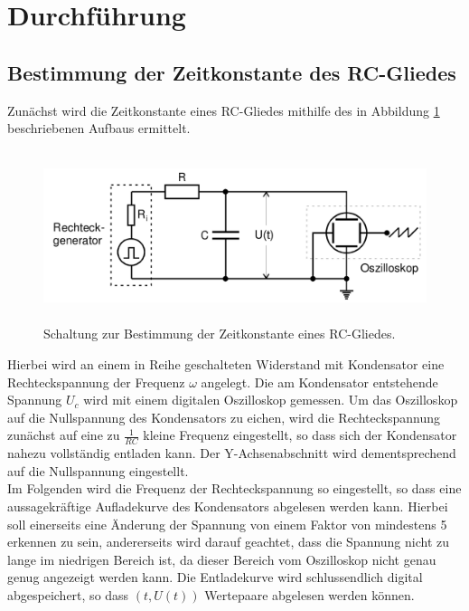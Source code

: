 \section{Durchführung}
\label{sec:Durchführung}
\subsection{Bestimmung der Zeitkonstante des RC-Gliedes}
Zunächst wird die Zeitkonstante eines RC-Gliedes mithilfe des in Abbildung \ref{fig:aufbau_a} beschriebenen Aufbaus ermittelt.
\begin{figure}[H]
  \centering
  \includegraphics[height=5cm]{aufbau_a.png}
  \caption{Schaltung zur Bestimmung der Zeitkonstante eines RC-Gliedes. \cite{sample}}
  \label{fig:aufbau_a}
\end{figure}
Hierbei wird an einem in Reihe geschalteten Widerstand mit Kondensator eine Rechteckspannung der Frequenz $\omega$ angelegt.
Die am Kondensator entstehende Spannung $U_c$ wird mit einem digitalen Oszilloskop gemessen.
Um das Oszilloskop auf die Nullspannung des Kondensators zu eichen, wird die Rechteckspannung zunächst auf eine zu $\frac{1}{RC}$ kleine Frequenz eingestellt, so dass sich der Kondensator nahezu vollständig entladen kann.
Der Y-Achsenabschnitt wird dementsprechend auf die Nullspannung eingestellt.\\
Im Folgenden wird die Frequenz der Rechteckspannung so eingestellt, so dass eine aussagekräftige Aufladekurve des Kondensators abgelesen werden kann.
Hierbei soll einerseits eine Änderung der Spannung von einem Faktor von mindestens 5 erkennen zu sein, andererseits wird darauf geachtet, dass die Spannung nicht zu lange im niedrigen Bereich ist, da dieser Bereich vom Oszilloskop nicht genau genug angezeigt werden kann.
Die Entladekurve wird schlussendlich digital abgespeichert, so dass $(t, U(t))$ Wertepaare abgelesen werden können.

